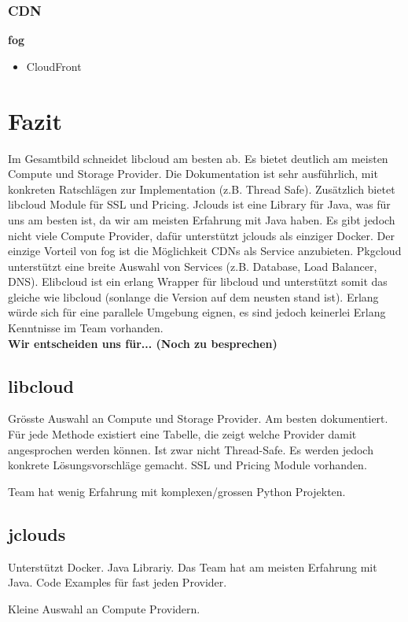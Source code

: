 \documentclass[11pt]{scrartcl}
\begin{document}
\subsubsection{CDN}
\textbf{fog}
\begin{itemize}
\item CloudFront
\end{itemize}

\newpage

\section{Fazit}

Im Gesamtbild schneidet libcloud am besten ab. Es bietet deutlich am meisten Compute und Storage Provider. Die Dokumentation ist sehr ausführlich, mit konkreten Ratschlägen zur Implementation (z.B. Thread Safe). Zusätzlich bietet libcloud Module für SSL und Pricing.
Jclouds ist eine Library für Java, was für uns am besten ist, da wir am meisten Erfahrung mit Java haben. Es gibt jedoch nicht viele Compute Provider, dafür unterstützt jclouds als einziger Docker.
Der einzige Vorteil von fog ist die Möglichkeit CDNs als Service anzubieten.
Pkgcloud unterstützt eine breite Auswahl von Services (z.B. Database, Load Balancer, DNS).
Elibcloud ist ein erlang Wrapper für libcloud und unterstützt somit das gleiche wie libcloud (sonlange die Version auf dem neusten stand ist). Erlang würde sich für eine parallele Umgebung eignen, es sind jedoch keinerlei Erlang Kenntnisse im Team vorhanden.\\

\textbf{Wir entscheiden uns für... (Noch zu besprechen)}

\subsection{libcloud}
\begin{Argumentation}
\pro Grösste Auswahl an Compute und Storage Provider.
\pro Am besten dokumentiert. Für jede Methode existiert eine Tabelle, die zeigt welche Provider damit angesprochen werden können.
\pro Ist zwar nicht Thread-Safe. Es werden jedoch konkrete Lösungsvorschläge gemacht.
\pro SSL und Pricing Module vorhanden.

\contra Team hat wenig Erfahrung mit komplexen/grossen Python Projekten.
\end{Argumentation}

\subsection{jclouds}
\begin{Argumentation}
\pro Unterstützt Docker.
\pro Java Librariy. Das Team hat am meisten Erfahrung mit Java.
\pro Code Examples für fast jeden Provider.

\contra Kleine Auswahl an Compute Providern.
\end{Argumentation}
\end{document}
